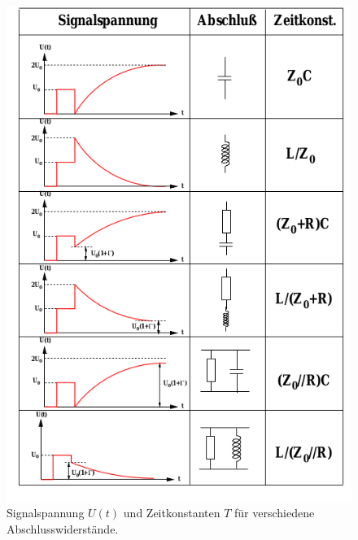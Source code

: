 \documentclass[
	11pt,
	a4paper,
	fleqn,
	ngerman,
	parskip,
	toc=bibliography
]{scrartcl}
\begin{document}
\begin{figure}[htpb]
  \centering
  \includegraphics[scale=0.6]{bilder/abschluss.png}
  \caption{Signalspannung $U(t)$ und Zeitkonstanten $T$ für verschiedene
  Abschlusswiderstände.}
\label{fig:abschluesse}
\end{figure}

\end{document}
